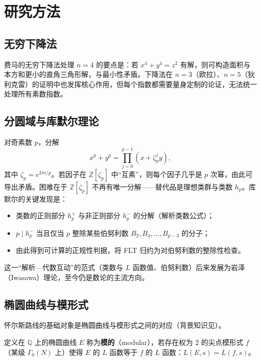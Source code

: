 \section{研究方法}\label{sec:methods}

\subsection{无穷下降法}

费马的无穷下降法处理 $n=4$ 的要点是：若 $x^4 + y^4 = z^2$ 有解，则可构造面积与本方和更小的直角三角形解，与最小性矛盾。下降法在 $n=3$（欧拉）、$n=5$（狄利克雷）的证明中也发挥核心作用，但每个指数都需要量身定制的论证，无法统一处理所有素数指数。

\subsection{分圆域与库默尔理论}

对奇素数 $p$，分解
\begin{equation}
    x^p + y^p = \prod_{j=0}^{p-1} (x + \zeta_p^j y),
\end{equation}
其中 $\zeta_p = e^{2\pi i/p}$。若因子在 $\mathbb{Z}[\zeta_p]$ 中“互素”，则每个因子几乎是 $p$ 次幂，由此可导出矛盾。困难在于 $\mathbb{Z}[\zeta_p]$ 不再有唯一分解——替代品是理想类群与类数 $h_p$。库默尔的关键发现是：

\begin{itemize}
    \item 类数的正则部分 $h_p^+$ 与非正则部分 $h_p^-$ 的分解（解析类数公式）；
    \item $p \mid h_p^-$ 当且仅当 $p$ 整除某些伯努利数 $B_2, B_4, \ldots, B_{p-3}$ 的分子；
    \item 由此得到可计算的正规性判据，将 FLT 归约为对伯努利数的整除性检查。
\end{itemize}

这一“解析—代数互动”的范式（类数与 $L$ 函数值、伯努利数）后来发展为岩泽（Iwasawa）理论，至今仍是数论的主流方向。

\subsection{椭圆曲线与模形式}

怀尔斯路线的基础对象是椭圆曲线与模形式之间的对应（背景知识见\cite{silverman2009arithmetic}）。

\begin{definition}[模性]
    定义在 $\mathbb{Q}$ 上的椭圆曲线 $E$ 称为\textbf{模的}（modular），若存在权为 $2$ 的尖点模形式 $f$（某级 $\Gamma_0(N)$ 上）使得 $E$ 的 $L$ 函数等于 $f$ 的 $L$ 函数：$L(E, s) = L(f, s)$。
\end{definition}

